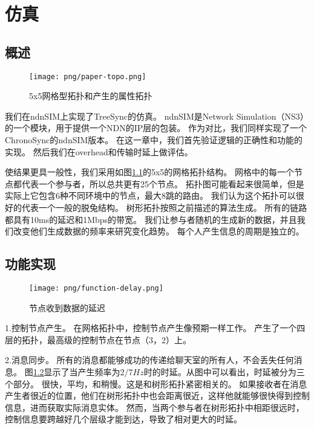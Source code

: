 \chapter{仿真}
\label{chapter:simu}

\section{概述}

\begin{figure}
\centering
\texttt{[image: png/paper-topo.png]}
\caption{5x5网格型拓扑和产生的属性拓扑}
\label{fig:paper_topo}
\end{figure}

我们在ndnSIM上实现了TreeSync的仿真。
ndnSIM是Network Simulation（NS3）的一个模块，用于提供一个NDN的IP层的包装。
作为对比，我们同样实现了一个ChronoSync的ndnSIM版本。
在这一章中，我们首先验证逻辑的正确性和功能的实现。
然后我们在overhead和传输时延上做评估。

使结果更具一般性，我们采用如图\ref{fig:paper_topo}的5x5的网格拓扑结构。
网格中的每一个节点都代表一个参与者，所以总共更有25个节点。
拓扑图可能看起来很简单，但是实际上它包含6种不同环境中的节点，最大8跳的路由。
我们认为这个拓扑可以很好的代表一个一般的脱兔结构。
树形拓扑按照之前描述的算法生成。
所有的链路都具有10ms的延迟和1Mbps的带宽。
我们让参与者随机的生成新的数据，并且我们改变他们生成数据的频率来研究变化趋势。
每个人产生信息的周期是独立的。

\section{功能实现}

\begin{figure}
\centering
\texttt{[image: png/function-delay.png]}
\caption{节点收到数据的延迟}
\label{fig:function_delay}
\end{figure}

1.控制节点产生。
在网格拓扑中，控制节点产生像预期一样工作。
产生了一个四层的拓扑，最高级的控制节点在节点（3，2）上。

2.消息同步。
所有的消息都能够成功的传递给聊天室的所有人，不会丢失任何消息。
图\ref{fig:function_delay}显示了当产生频率为$2/7Hz$时的时延。从图中可以看出，时延被分为三个部分。
很快，平均，和稍慢。这是和树形拓扑紧密相关的。
如果接收者在消息产生者很近的位置，他们在树形拓扑中也会距离很近，这样他就能够很快得到控制信息，进而获取实际消息实体。
然而，当两个参与者在树形拓扑中相距很远时，控制信息要跨越好几个层级才能到达，导致了相对更大的时延。


